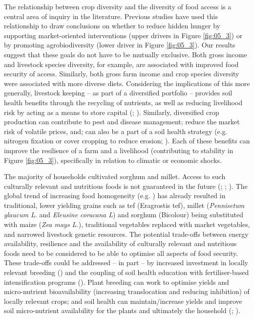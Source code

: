 The relationship between crop diversity and the diversity of food access is a central area of inquiry in the literature. Previous studies have used this relationship to draw conclusions on whether to reduce hidden hunger by supporting market-oriented interventions (upper drivers in Figure \ref{fig:05_3}) or by promoting agrobiodiversity (lower driver in Figure \ref{fig:05_3}). Our results suggest that these goals do not have to be mutually exclusive. Both gross income and livestock species diversity, for example, are associated with improved food security of access. Similarly, both gross farm income and crop species diversity were associated with more diverse diets. Considering the implications of this more generally, livestock keeping -- as part of a diversified portfolio -- provides soil health benefits through the recycling of nutrients, as well as reducing livelihood risk by acting as a means to store capital (\citealp{Moll2005}; \citealp{Slingerland2000}). Similarly, diversified crop production can contribute to pest and disease management; reduce the market risk of volatile prices, and; can also be a part of a soil health strategy (e.g. nitrogen fixation or cover cropping to reduce erosion; \citealp{Lin2011}). Each of these benefits can improve the resilience of a farm and a livelihood (contributing to stability in Figure \ref{fig:05_3}), specifically in relation to climatic or economic shocks.

The majority of households cultivated sorghum and millet. Access to such culturally relevant and nutritious foods is not guaranteed in the future (\citealp{Schipanski2016}; \citealp{Pingali2015}; \citealp{Remans2014}). The global trend of increasing food homogeneity (e.g. \citealp{Khoury2014}) has already resulted in traditional, lower yielding grains such as tef (Eragrostis tef), millet (\textit{Pennisetum glaucum L}. and \textit{Eleusine coracana L}) and sorghum (Bicolour) being substituted with maize (\textit{Zea mays L.}), traditional vegetables replaced with market vegetables, and narrowed livestock genetic resources. The potential trade-offs between energy availability, resilience and the availability of culturally relevant and nutritious foods need to be considered to be able to optimise all aspects of food security. These trade-offs could be addressed -- in part -- by increased investment in locally relevant breeding (\citealp{Sibhatu201510657}) and the coupling of soil health education with fertiliser-based intensification programs (\citealp{Fonte2012}). Plant breeding can work to optimise yields and micro-nutrient bioavailability (increasing translocation and reducing inhibition) of locally relevant crops; and soil health can maintain/increase yields and improve soil micro-nutrient availability for the plants and ultimately the household (\citealp{DeValenca2017}; \citealp{Slingerland2006}).

